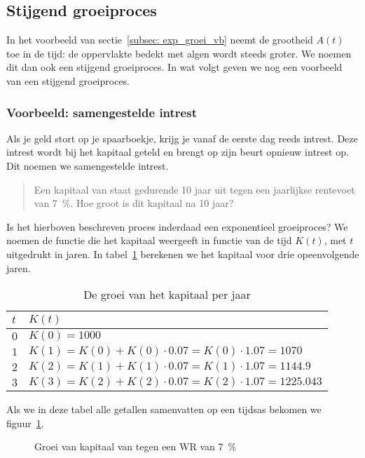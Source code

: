\subsection{Stijgend groeiproces}\label{subsec:stijgendGroeiproces}
In het voorbeeld van sectie~\ref{subsec: exp_groei_vb} neemt de grootheid $A(t)$ toe in de tijd: de
oppervlakte bedekt met algen wordt steeds groter. We noemen dit dan
ook een stijgend groeiproces. In wat volgt geven we nog een voorbeeld van een stijgend
groeiproces. 

\subsubsection{Voorbeeld: samengestelde intrest}\label{subsubsec.si}
Als je geld stort op je spaarboekje, krijg je vanaf de eerste dag reeds intrest. Deze intrest wordt bij het kapitaal geteld en brengt op zijn beurt opnieuw intrest op. Dit noemen we samengestelde intrest.
\begin{quote}
    Een kapitaal van  staat gedurende 10 jaar uit tegen een
jaarlijkse rentevoet van \SI{7}{\percent}. Hoe groot is dit kapitaal na 10
jaar?
\end{quote}
Is het hierboven beschreven proces inderdaad een exponentieel groeiproces? 
We noemen de functie die het kapitaal
weergeeft in functie van de tijd $K(t)$, met $t$ uitgedrukt in jaren.
In tabel~\ref{tbl:groeikap} berekenen we het kapitaal voor drie opeenvolgende jaren.
\begin{table}[tbp]
    \centering
    \caption{De groei van het kapitaal per jaar}
    \begin{tabular}{ll}
    \toprule
    $t$ & $K(t)$\\
    \midrule
    $0$ 	& $K(0)=1000$ 	\\
    $1$	&$K(1)=K(0)+K(0)\cdot \num{0.07}=  K(0)\cdot \num{1.07}=1070$\\
   $2$	&$K(2)=K(1)+K(1)\cdot \num{0.07}= K(1)\cdot \num{1.07}=\num{1144.9}$ \\
   $3$	&$K(3)=K(2)+K(2)\cdot \num{0.07}= K(2)\cdot \num{1.07}=\num{1225.043}$ \\
\bottomrule
\end{tabular}
\label{tbl:groeikap}
\end{table}
Als we in deze tabel alle getallen samenvatten op een tijdsas bekomen we figuur~\ref{fig:kapitaalgroei}.
\begin{figure}[htbp]
    \centering
{}
    \caption{Groei van kapitaal van  tegen een WR van \SI{7}{\percent}}
    \label{fig:kapitaalgroei} 
\end{figure}



